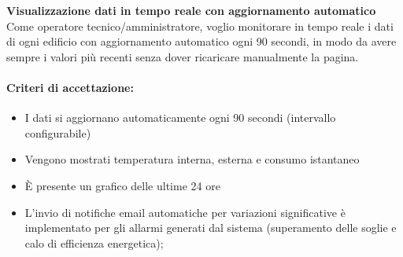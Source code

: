 \textbf{Visualizzazione dati in tempo reale con aggiornamento automatico} \\
Come operatore tecnico/amministratore, voglio monitorare in tempo reale i dati di ogni edificio con aggiornamento automatico ogni 90 secondi, in modo da avere sempre i valori più recenti senza dover ricaricare manualmente la pagina.

\paragraph*{Criteri di accettazione:}
\begin{itemize}
    \item I dati si aggiornano automaticamente ogni 90 secondi (intervallo configurabile)
    \item Vengono mostrati temperatura interna, esterna e consumo istantaneo
    \item È presente un grafico delle ultime 24 ore
    \item L'invio di notifiche email automatiche per variazioni significative è implementato per gli allarmi generati dal sistema (superamento delle soglie e calo di efficienza energetica);
\end{itemize}

